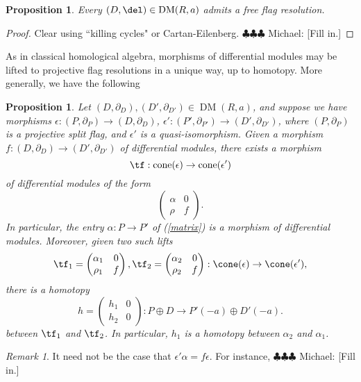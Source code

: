 \documentclass[12pt]{amsart}
\newtheorem{prop}[lemma]{Proposition}
\theoremstyle{definition}
\theoremstyle{remark}
\newtheorem{rem}[lemma]{Remark}
\newcommand{\michael}[1]{{\color{red} \sf $\clubsuit\clubsuit\clubsuit$ Michael: [#1]}}
\def\on{\operatorname}
\def\a{\alpha}
\def\DM{\operatorname{DM}}
\begin{document}
\begin{prop}
\label{resexists}
Every $(D, \del) \in \DM(R, a)$ admits a free flag resolution.
\end{prop}

\begin{proof}
Clear using ``killing cycles" or Cartan-Eilenberg. \michael{Fill in.} 
\end{proof}



As in classical homological algebra, morphisms of differential modules may be lifted to projective flag resolutions in a unique way, up to homotopy.  More generally, we have the following

\begin{prop}\label{prop:lifting}
Let $(D, \partial_D), (D', \partial_{D'}) \in \DM(R, a)$, and suppose we have morphisms $\epsilon : (P, \partial_P) \to (D, \partial_D)$, $\epsilon' : (P', \partial_{P'}) \to (D', \partial_{D'})$, where $(P, \partial_P)$ is a projective split flag, and $\epsilon'$ is a quasi-isomorphism. Given a morphism $f: (D, \partial_D) \to (D', \partial_{D'})$ of differential modules, there exists a morphism
$$
\tf:  \on{cone}(\epsilon) \to \on{cone}(\epsilon')
$$ 
of differential modules of the form 
\begin{equation}
\label{matrix}
\begin{pmatrix}
\alpha & 0  \\
\rho & f
\end{pmatrix}.
\end{equation}
In particular, the entry $\a: P \to P'$ of (\ref{matrix}) is a morphism of differential modules. Moreover, given two such lifts
$$
\tf_1 = \begin{pmatrix}
\alpha_1 & 0  \\
\rho_1 & f
\end{pmatrix}, 
\tf_2 = \begin{pmatrix}
\alpha_2 & 0  \\
\rho_2 & f
\end{pmatrix}
: \cone(\epsilon) \to \cone(\epsilon'),
$$
there is a homotopy 
$$
h = \begin{pmatrix} h_1 &0 \\ h_2 & 0 \end{pmatrix} : P \oplus D \to P'(-a) \oplus D'(-a).
$$
between $\tf_1$ and $\tf_2$. In particular, $h_1$ is a homotopy between $\a_2$ and $\a_1$.
\end{prop}

\begin{rem}
It need not be the case that $\epsilon' \a = f \epsilon$. For instance, \michael{Fill in.}
\end{rem}
\end{document}
